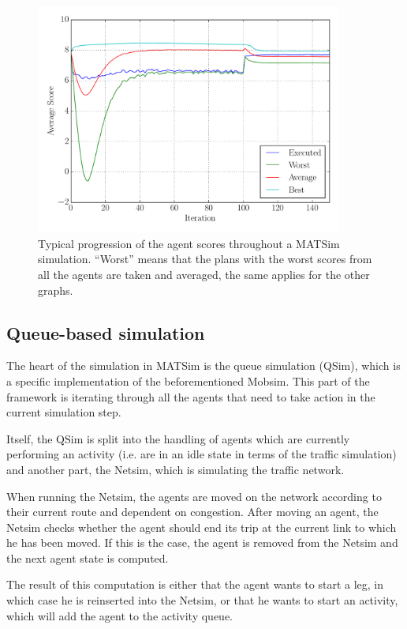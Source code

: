 \begin{figure}
    \centering
    \includegraphics[width=0.9\textwidth]{figures/scorestats.pdf}
    \caption{Typical progression of the agent scores throughout a MATSim simulation.
    ``Worst'' means that the plans with the worst scores from all the agents are taken
    and averaged, the same applies for the other graphs.}
    \label{fig:scorestats}
\end{figure}

\subsection{Queue-based simulation}

The heart of the simulation in MATSim is the queue simulation (QSim), which is a
specific implementation of the beforementioned Mobsim. This part of the framework
is iterating through all the agents that need to take action in the current simulation step.

Itself, the QSim is split into the handling of agents which are currently performing
an activity (i.e. are in an idle state in terms of the traffic simulation) and another
part, the Netsim, which is simulating the traffic network.

When running the Netsim, the agents are moved on the network according to their
current route and dependent on congestion. After moving an agent, the Netsim checks
whether the agent should end its trip at the current link to which he has been moved. If
this is the case, the agent is removed from the Netsim and the next agent state is computed.

The result of this computation is either that the agent wants to start a leg, in
which case he is reinserted into the Netsim, or that he wants to start an activity,
which will add the agent to the activity queue.

